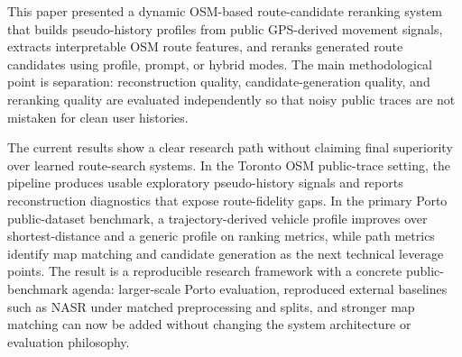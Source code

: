 This paper presented a dynamic OSM-based route-candidate reranking system that builds pseudo-history profiles from public GPS-derived movement signals, extracts interpretable OSM route features, and reranks generated route candidates using profile, prompt, or hybrid modes. The main methodological point is separation: reconstruction quality, candidate-generation quality, and reranking quality are evaluated independently so that noisy public traces are not mistaken for clean user histories.

The current results show a clear research path without claiming final superiority over learned route-search systems. In the Toronto OSM public-trace setting, the pipeline produces usable exploratory pseudo-history signals and reports reconstruction diagnostics that expose route-fidelity gaps. In the primary Porto public-dataset benchmark, a trajectory-derived vehicle profile improves over shortest-distance and a generic profile on ranking metrics, while path metrics identify map matching and candidate generation as the next technical leverage points. The result is a reproducible research framework with a concrete public-benchmark agenda: larger-scale Porto evaluation, reproduced external baselines such as NASR under matched preprocessing and splits, and stronger map matching can now be added without changing the system architecture or evaluation philosophy.
